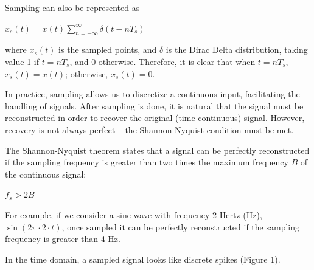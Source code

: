 \documentclass{article}
\begin{document}
Sampling can also be represented as 
\begin{center}
    \begin{math}
        x_s(t) = x(t) \displaystyle\sum_{n=-\infty}^{\infty} \delta (t-nT_s)
    \end{math}  
\end{center}
where $x_s(t)$ is the sampled points, and $\delta$ is the Dirac Delta distribution, taking value 1 if $t=nT_s$, and 0 otherwise.
Therefore, it is clear that when $t=nT_s$, $x_s(t) = x(t)$; otherwise, $x_s(t) = 0$. 

In practice, sampling allows us to discretize a continuous input, facilitating the handling of signals. After sampling is done, it is natural that the signal must be reconstructed in order to recover the original (time continuous) signal.
However, recovery is not always perfect -- the Shannon-Nyquist condition must be met.

The Shannon-Nyquist theorem states that a signal can be perfectly reconstructed if the sampling frequency is greater than two times the maximum frequency $B$ of the continuous signal:
\begin{center}
    \begin{math}
        f_s > 2B
    \end{math}  
\end{center}
For example, if we consider a sine wave with frequency 2 Hertz (Hz), $\sin(2\pi \cdot 2 \cdot t)$, once sampled it can be perfectly reconstructed if the sampling frequency is greater than 4 Hz.


In the time domain, a sampled signal looks like discrete spikes (Figure 1). 
\end{document}
